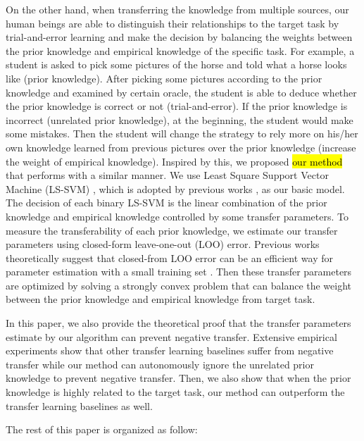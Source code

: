 On the other hand, when transferring the knowledge from multiple sources, our human beings are able to distinguish their relationships to the target task by trial-and-error learning and make the decision by balancing the weights between the prior knowledge and empirical knowledge of the specific task. For example, a student is asked to pick some pictures of the horse and told what a horse looks like (prior knowledge). After picking some pictures according to the prior knowledge and examined by certain oracle, the student is able to deduce whether the prior knowledge is correct or not (trial-and-error). If the prior knowledge is incorrect (unrelated prior knowledge), at the beginning, the student would make some mistakes. Then the student will change the strategy to rely more on his/her own knowledge learned from previous pictures over the prior knowledge (increase the weight of empirical knowledge). 
Inspired by this, we proposed \hl{our method} that performs with a similar manner. 
We use Least Square Support Vector Machine (LS-SVM) \cite{suykens1999least}, which is adopted by previous works \cite{tommasi2014learning} \cite{kuzborskij2013n}, as our basic model. The decision of each binary LS-SVM is the linear combination of the prior knowledge and empirical knowledge controlled by some transfer parameters. To measure the transferability of each prior knowledge, we estimate our transfer parameters using closed-form leave-one-out (LOO) error. Previous works theoretically suggest that closed-from LOO error can be an efficient way for parameter estimation with a small training set \cite{kuzborskij2013stability} \cite{cawley2006leave}. Then these transfer parameters are optimized by solving a strongly convex problem that can balance the weight between the prior knowledge and empirical knowledge from target task. 

In this paper, we also provide the theoretical proof that the transfer parameters estimate by our algorithm can prevent negative transfer. Extensive empirical experiments show that other transfer learning baselines suffer from negative transfer while our method can autonomously ignore the unrelated prior knowledge to prevent negative transfer. Then, we also show that when the prior knowledge is highly related to the target task, our method can outperform the transfer learning baselines as well.

The rest of this paper is organized as follow:
  
